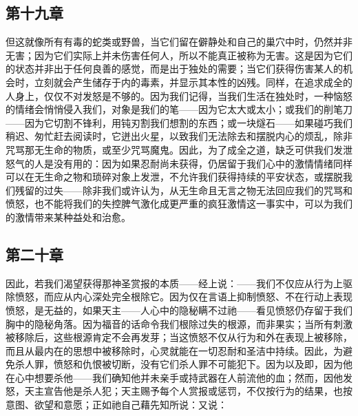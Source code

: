 
\subsection{第十九章}

\par

但这就像所有有毒的蛇类或野兽，当它们留在僻静处和自己的巢穴中时，仍然并非无害；因为它们实际上并未伤害任何人，所以不能真正被称为无害。这是因为它们的状态并非出于任何良善的感觉，而是出于独处的需要；当它们获得伤害某人的机会时，立刻就会产生储存于内的毒素，并显示其本性的凶残。同样，在追求成全的人身上，仅仅不对发怒是不够的。因为我们记得，当我们生活在独处时，一种恼怒的情绪会悄悄侵入我们，对象是我们的笔——因为它太大或太小；或我们的削笔刀——因为它切割不锋利，用钝刃割我们想割的东西；或一块燧石——如果碰巧我们稍迟、匆忙赶去阅读时，它迸出火星，以致我们无法除去和摆脱内心的烦乱，除非咒骂那无生命的物质，或至少咒骂魔鬼。因此，为了成全之道，缺乏可供我们发泄怒气的人是没有用的：因为如果忍耐尚未获得，仍居留于我们心中的激情情绪同样可以在无生命之物和琐碎对象上发泄，不允许我们获得持续的平安状态，或摆脱我们残留的过失——除非我们或许认为，从无生命且无言之物无法回应我们的咒骂和愤怒，也不能将我们的失控脾气激化成更严重的疯狂激情这一事实中，可以为我们的激情带来某种益处和治愈。\par


\subsection{第二十章}

\par

因此，若我们渴望获得那神圣赏报的本质——经上说：——我们不仅应从行为上驱除愤怒，而应从内心深处完全根除它。因为仅在言语上抑制愤怒、不在行动上表现愤怒，是无益的，如果天主——人心中的隐秘瞒不过祂——看见愤怒仍存留于我们胸中的隐秘角落。因为福音的话命令我们根除过失的根源，而非果实；当所有刺激被移除后，这些根源肯定不会再发芽；当这愤怒不仅从行为和外在表现上被移除，而且从最内在的思想中被移除时，心灵就能在一切忍耐和圣洁中持续。因此，为避免杀人罪，愤怒和仇恨被切断，没有它们杀人罪不可能犯下。因为以及即，因为他在心中想要杀他——我们确知他并未亲手或持武器在人前流他的血；然而，因他发怒，天主宣告他是杀人犯；天主赐予每个人赏报或惩罚，不仅按行为的结果，也按意图、欲望和意愿；正如祂自己藉先知所说：又说：\par

